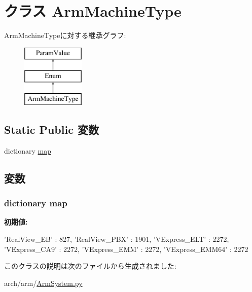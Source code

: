 \hypertarget{classArmSystem_1_1ArmMachineType}{
\section{クラス ArmMachineType}
\label{classArmSystem_1_1ArmMachineType}
}
ArmMachineTypeに対する継承グラフ:\begin{figure}[H]
\begin{center}
\leavevmode
\includegraphics[height=3cm]{classArmSystem_1_1ArmMachineType}
\end{center}
\end{figure}
\subsection*{Static Public 変数}
\begin{DoxyCompactItemize}
\item 
dictionary \hyperlink{classArmSystem_1_1ArmMachineType_aca70ca58dda85cf4fe7a0737ec18e004}{map}
\end{DoxyCompactItemize}


\subsection{変数}
\hypertarget{classArmSystem_1_1ArmMachineType_aca70ca58dda85cf4fe7a0737ec18e004}{
\subsubsection[{map}]{\setlength{\rightskip}{0pt plus 5cm}dictionary map}}
\label{classArmSystem_1_1ArmMachineType_aca70ca58dda85cf4fe7a0737ec18e004}
{\bfseries 初期値:}
\begin{DoxyCode}
{'RealView_EB' : 827,
           'RealView_PBX' : 1901,
           'VExpress_ELT' : 2272,
           'VExpress_CA9' : 2272,
           'VExpress_EMM' : 2272,
           'VExpress_EMM64' : 2272}
\end{DoxyCode}


このクラスの説明は次のファイルから生成されました:\begin{DoxyCompactItemize}
\item 
arch/arm/\hyperlink{ArmSystem_8py}{ArmSystem.py}\end{DoxyCompactItemize}
